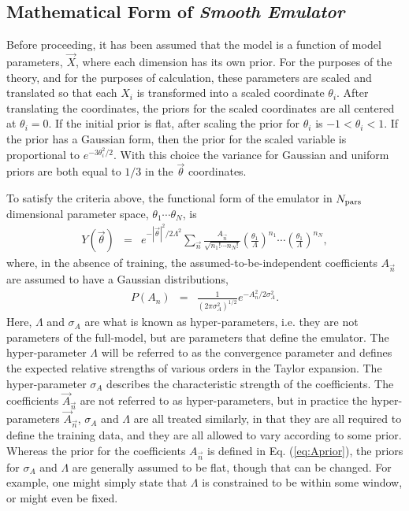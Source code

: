 \documentclass[UserManual.tex]{subfiles}
\begin{document}
\subsection{Mathematical Form of {\it Smooth Emulator}}

Before proceeding, it has been assumed that the model is a function of model parameters, $\vec{X}$, where each dimension has its own prior. For the purposes of the theory, and for the purposes of calculation, these parameters are scaled and translated so that each $X_i$ is transformed into a scaled coordinate $\theta_i$. After translating the coordinates, the priors for the scaled coordinates are all centered at $\theta_i=0$. If the initial prior is flat, after scaling the prior for $\theta_i$ is $-1<\theta_i<1$. If the prior has a Gaussian form, then the prior for the scaled variable is proportional to $e^{-3\theta_i^2/2}$. With this choice the variance for Gaussian and uniform priors are both equal to $1/3$ in the $\vec{\theta}$ coordinates.

To satisfy the criteria above, the functional form of the emulator in $N_{\rm pars}$ dimensional parameter space, $\theta_1\cdots\theta_N$, is
\begin{eqnarray}
Y(\vec{\theta})&=&e^{-|\vec{\theta}|^2/2\Lambda^2}
\sum_{\vec{n}} \frac{A_{\vec{n}}}{\sqrt{n_1!\cdots n_N!}}\left(\frac{\theta_1}{\Lambda}\right)^{n_1}\cdots\left(\frac{\theta_1}{\Lambda}\right)^{n_N},
\end{eqnarray}
where, in the absence of training, the assumed-to-be-independent coefficients $A_{\vec{n}}$ are assumed to have a Gaussian distributions,
\begin{eqnarray}\label{eq:Aprior}
P(A_n)&=& \frac{1}{(2\pi\sigma_A^2)^{1/2}}e^{-A_n^2/2\sigma_A^2}.
\end{eqnarray}
Here, $\Lambda$ and $\sigma_A$ are what is known as hyper-parameters, i.e. they are not parameters of the full-model, but are parameters that define the emulator. The hyper-parameter $\Lambda$ will be referred to as the convergence parameter and defines the expected relative strengths of various orders in the Taylor expansion. The hyper-parameter $\sigma_A$ describes the characteristic strength of the coefficients. The coefficients $\vec{A}_{\vec{n}}$ are not referred to as hyper-parameters, but in practice the hyper-parameters $\vec{A}_{\vec{n}}$, $\sigma_A$ and $\Lambda$ are all treated similarly, in that they are all required to define the training data, and they are all allowed to vary according to some prior. Whereas the prior for the coefficients $A_{\vec{n}}$ is defined in Eq. (\ref{eq:Aprior}), the priors for $\sigma_A$ and $\Lambda$ are generally assumed to be flat, though that can be changed. For example, one might simply state that $\Lambda$ is constrained to be within some window, or might even be fixed.
\end{document}
